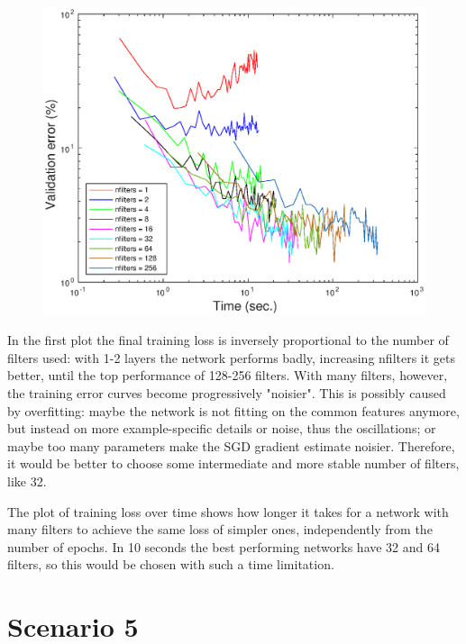 \documentclass{article}
\begin{document}
    \begin{figure}[!htb]
        \centering
        \includegraphics[width=\textwidth]{figures/sc4_val_err_time}
    \end{figure}
    
    In the first plot the final training loss is inversely proportional to the number of filters used: with 1-2 layers the network performs badly,
    increasing nfilters it gets better, until the top performance of 128-256 filters. With many filters, however, the training error curves become
    progressively "noisier". This is possibly caused by overfitting: maybe the network is not fitting on the common features anymore, 
    but instead on more example-specific details or noise, thus the oscillations; or maybe too many parameters make the SGD gradient estimate noisier.
    Therefore, it would be better to choose some intermediate and more stable number of filters, like 32.
    
    The plot of training loss over time shows how longer it takes for a network with many filters to achieve the same loss of simpler ones, 
    independently from the number of epochs. 
    In 10 seconds the best performing networks have 32 and 64 filters, so this would be chosen with such a time limitation.
    
    
    
    
\section*{Scenario 5}
    
\end{document}
